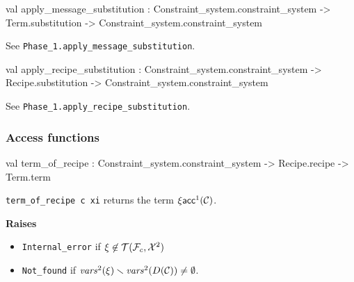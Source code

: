 \begin{ocamldocsigend}
\begin{ocamldocdescription}
\end{ocamldocdescription}


\label{val:Constraint-underscoresystem.Phase-underscore2.apply-underscoremessage-underscoresubstitution}\begin{ocamldoccode}
val apply_message_substitution :
  Constraint_system.constraint_system ->
  Term.substitution -> Constraint_system.constraint_system
\end{ocamldoccode}
\begin{ocamldocdescription}
See {\tt{Phase\_1.apply\_message\_substitution}}.


\end{ocamldocdescription}


\label{val:Constraint-underscoresystem.Phase-underscore2.apply-underscorerecipe-underscoresubstitution}\begin{ocamldoccode}
val apply_recipe_substitution :
  Constraint_system.constraint_system ->
  Recipe.substitution -> Constraint_system.constraint_system
\end{ocamldoccode}
\begin{ocamldocdescription}
See {\tt{Phase\_1.apply\_recipe\_substitution}}.


\end{ocamldocdescription}


\subsubsection{Access functions}


\label{val:Constraint-underscoresystem.Phase-underscore2.term-underscoreof-underscorerecipe}\begin{ocamldoccode}
val term_of_recipe :
  Constraint_system.constraint_system -> Recipe.recipe -> Term.term
\end{ocamldoccode}
\begin{ocamldocdescription}
{\tt{term\_of\_recipe c xi}} returns the term $\xi\mathsf{acc}^1(\mathcal{C})$. 

{\bf Raises} \begin{itemize}
\item {\tt{Internal\_error}} if $\xi \not\in \mathcal{T}(\mathcal{F}_c, \mathcal{X}^2)$ 
\item {\tt{Not\_found}} if $\mathit{vars}^2(\xi) \smallsetminus \mathit{vars}^2(D(\mathcal{C})) \neq \emptyset$. 
\end{itemize}




\end{ocamldocdescription}
\end{ocamldocsigend}
